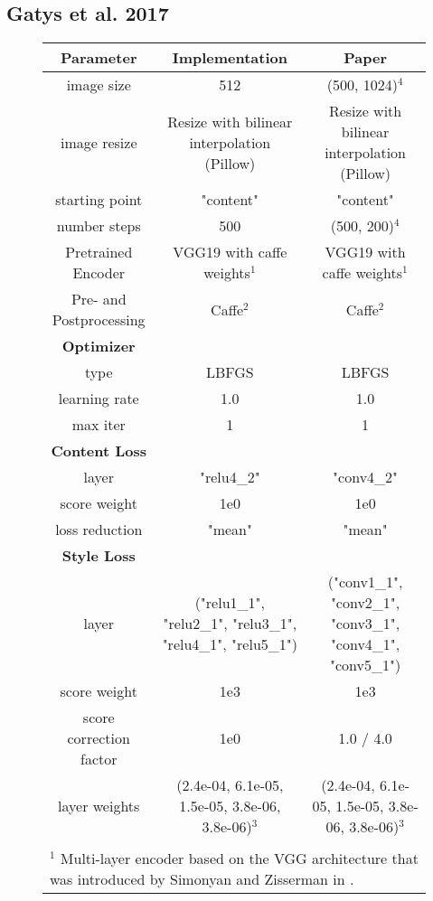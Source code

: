 \subsection{Gatys et al. 2017}
\begin{figure}[H]
	\vspace{19cm}
	\begin{center}
		\begin{rotate}{90}
			\footnotesize
			\centering
		\begin{tabular}{c|c|c}
			\hline
			\bfseries Parameter & \bfseries Implementation & \bfseries Paper\\
			\hline\hline
			image size & 512 & (500, 1024)$^4$ \\
			image resize & Resize with bilinear interpolation (Pillow) & Resize with bilinear interpolation (Pillow)\\
			starting point & "content" & "content" \\
			number steps & 500 & (500, 200)$^4$ \\
			Pretrained Encoder & VGG19 with caffe weights$^1$ & VGG19 with caffe weights$^1$ \\
			Pre- and Postprocessing & Caffe$^2$ & Caffe$^2$\\
			\hline
			\bfseries Optimizer & &\\
			\hline
			type & LBFGS & LBFGS\\
			learning rate & 1.0 & 1.0\\
			max iter & 1 & 1 \\
			\hline
			\bfseries  Content Loss & & \\
			\hline
			layer & "relu4\_2" & "conv4\_2" \\
			score weight & 1e0 & 1e0 \\
			loss reduction & "mean" & "mean" \\
			\hline
			\bfseries  Style Loss & & \\
			\hline
			layer & ("relu1\_1", "relu2\_1", "relu3\_1", "relu4\_1", "relu5\_1") & ("conv1\_1", "conv2\_1", "conv3\_1", "conv4\_1", "conv5\_1") \\
			score weight & 1e3 & 1e3 \\
			score correction factor & 1e0 & 1.0 / 4.0 \\
			layer weights & (2.4e-04, 6.1e-05, 1.5e-05, 3.8e-06, 3.8e-06)$^3$ & (2.4e-04, 6.1e-05, 1.5e-05, 3.8e-06, 3.8e-06)$^3$ \\
			\hline
			\multicolumn{3}{l}{ }\\
			\multicolumn{3}{l}{\scriptsize{$^1$ Multi-layer encoder based on the VGG architecture that was introduced by Simonyan and Zisserman in \cite{SZ2015}.}}\\

\end{tabular}
\end{rotate}
\end{center}
\end{figure}
